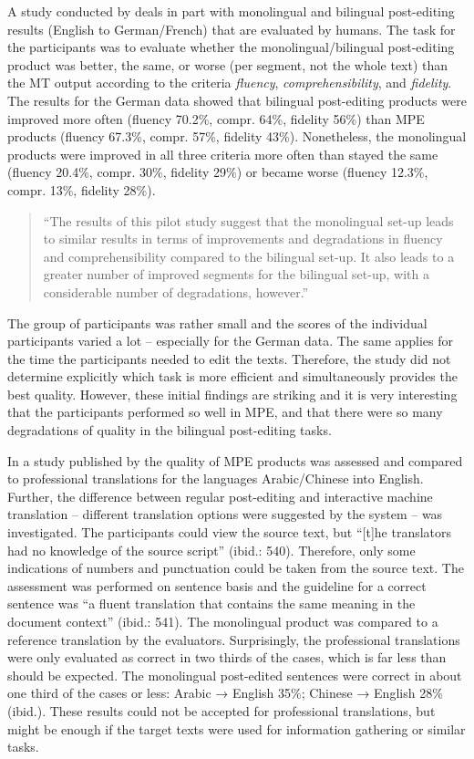 \documentclass[output=paper]{langsci/langscibook}
\begin{document}
A study conducted by \citet{mitchell2013} deals in part with monolingual and bilingual post-editing results (English to German/French) that are evaluated by humans. The task for the participants was to evaluate whether the monolingual/bilingual post-editing product was better, the same, or worse (per segment, not the whole text) than the MT output according to the criteria \textit{fluency}, \textit{comprehensibility}, and \textit{fidelity}. The results for the German data showed that bilingual post-editing products were improved more often (fluency 70.2\%, compr. 64\%, fidelity 56\%) than MPE products (fluency 67.3\%, compr. 57\%, fidelity 43\%). Nonetheless, the monolingual products were improved in all three criteria more often than stayed the same (fluency 20.4\%, compr. 30\%, fidelity 29\%) or became worse (fluency 12.3\%, compr. 13\%, fidelity 28\%).


\begin{quotation}
``The results of this pilot study suggest that the monolingual set-up leads to similar results in terms of improvements and degradations in fluency and comprehensibility compared to the bilingual set-up. It also leads to a greater number of improved segments for the bilingual set-up, with a considerable number of degradations, however.'' \citep[4]{mitchell2013}\end{quotation}

The group of participants was rather small and the scores of the individual participants varied a lot -- especially for the German data. The same applies for the time the participants needed to edit the texts. Therefore, the study did not determine explicitly which task is more efficient and simultaneously provides the best quality. However, these initial findings are striking and it is very interesting that the participants performed so well in MPE, and that there were so many degradations of quality in the bilingual post-editing tasks.



In a study published by \citet{Koehn2010} the quality of MPE products was assessed and compared to professional translations for the languages Arabic/Chinese into English. Further, the difference between regular post-editing and interactive machine translation -- different translation options were suggested by the system -- was investigated. The participants could view the source text, but ``[t]he translators had no knowledge of the source script'' (ibid.: 540). Therefore, only some indications of numbers and punctuation could be taken from the source text. The assessment was performed on sentence basis and the guideline for a correct sentence was ``a fluent translation that contains the same meaning in the document context'' (ibid.: 541). The monolingual product was compared to a reference translation by the evaluators. Surprisingly, the professional translations were only evaluated as correct in two thirds of the cases, which is far less than should be expected. The monolingual post-edited sentences were correct in about one third of the cases or less: Arabic → English 35\%; Chinese → English 28\% (ibid.). These results could not be accepted for professional translations, but might be enough if the target texts were used for information gathering or similar tasks.
\end{document}
